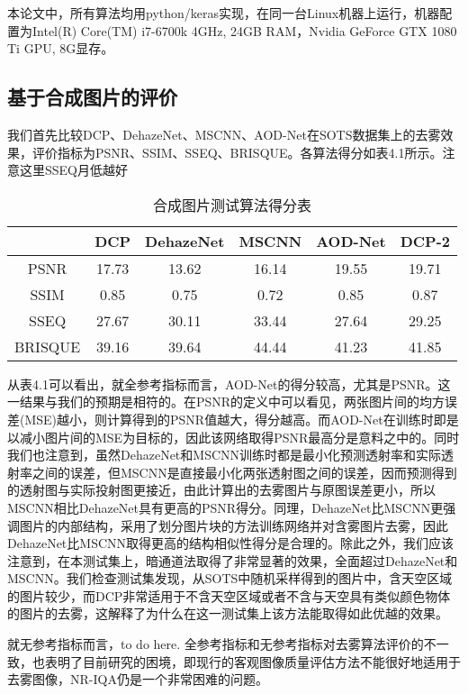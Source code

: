 \documentclass[a4paper, 12pt, oneside]{report}
\begin{document}
{本论文中，所有算法均用python/keras实现，在同一台Linux机器上运行，机器配置为Intel(R) Core(TM) i7-6700k 4GHz, 24GB RAM，Nvidia GeForce GTX 1080 Ti GPU, 8G显存。

\subsection{基于合成图片的评价\quad}
我们首先比较DCP、DehazeNet、MSCNN、AOD-Net在SOTS数据集上的去雾效果，评价指标为PSNR、SSIM、SSEQ、BRISQUE。各算法得分如表4.1所示。{\Large 注意这里SSEQ月低越好}

\begin{table}[htbp]
  \centering
  \caption{合成图片测试算法得分表}
    \begin{tabular}{c|c|c|c|c|c}
    \hline
         & DCP    & DehazeNet  & MSCNN    & AOD-Net & DCP-2 \\
    \hline
    	PSNR	 & 17.73    & 13.62 & 16.14    & 19.55 & 19.71\\
	\hline
     SSIM     & 0.85 & 0.75 & 0.72     & 0.85  &0.87 \\
	\hline
    SSEQ & 27.67 & 30.11 &  33.44   & 27.64 & 29.25\\
    \hline
     BRISQUE     &  39.16     &    39.64   &  44.44 & 41.23  &  41.85 \\
     \hline
  
    \end{tabular}%
  \label{tab:4.1}%
\end{table}%
从表4.1可以看出，就全参考指标而言，AOD-Net的得分较高，尤其是PSNR。这一结果与我们的预期是相符的。在PSNR的定义中可以看见，两张图片间的均方误差(MSE)越小，则计算得到的PSNR值越大，得分越高。而AOD-Net在训练时即是以减小图片间的MSE为目标的，因此该网络取得PSNR最高分是意料之中的。同时我们也注意到，虽然DehazeNet和MSCNN训练时都是最小化预测透射率和实际透射率之间的误差，但MSCNN是直接最小化两张透射图之间的误差，因而预测得到的透射图与实际投射图更接近，由此计算出的去雾图片与原图误差更小，所以MSCNN相比DehazeNet具有更高的PSNR得分。同理，DehazeNet比MSCNN更强调图片的内部结构，采用了划分图片块的方法训练网络并对含雾图片去雾，因此DehazeNet比MSCNN取得更高的结构相似性得分是合理的。除此之外，我们应该注意到，在本测试集上，暗通道法取得了非常显著的效果，全面超过DehazeNet和MSCNN。我们检查测试集发现，从SOTS中随机采样得到的图片中，含天空区域的图片较少，而DCP非常适用于不含天空区域或者不含与天空具有类似颜色物体的图片的去雾，这解释了为什么在这一测试集上该方法能取得如此优越的效果。

就无参考指标而言，to do here. 全参考指标和无参考指标对去雾算法评价的不一致，也表明了目前研究的困境，即现行的客观图像质量评估方法不能很好地适用于去雾图像，NR-IQA仍是一个非常困难的问题。

}
\end{document}
